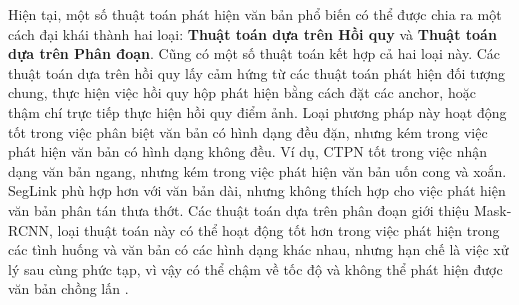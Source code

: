 Hiện tại, một số thuật toán phát hiện văn bản phổ biến có thể được chia ra một cách đại khái thành hai loại: \textbf{Thuật toán dựa trên Hồi quy} và \textbf{Thuật toán dựa trên Phân đoạn}. Cũng có một số thuật toán kết hợp cả hai loại này. Các thuật toán dựa trên hồi quy lấy cảm hứng từ các thuật toán phát hiện đối tượng chung, thực hiện việc hồi quy hộp phát hiện bằng cách đặt các anchor, hoặc thậm chí trực tiếp thực hiện hồi quy điểm ảnh. Loại phương pháp này hoạt động tốt trong việc phân biệt văn bản có hình dạng đều đặn, nhưng kém trong việc phát hiện văn bản có hình dạng không đều. Ví dụ, CTPN tốt trong việc nhận dạng văn bản ngang, nhưng kém trong việc phát hiện văn bản uốn cong và xoắn. SegLink phù hợp hơn với văn bản dài, nhưng không thích hợp cho việc phát hiện văn bản phân tán thưa thớt. Các thuật toán dựa trên phân đoạn giới thiệu Mask-RCNN, loại thuật toán này có thể hoạt động tốt hơn trong việc phát hiện trong các tình huống và văn bản có các hình dạng khác nhau, nhưng hạn chế là việc xử lý sau cùng phức tạp, vì vậy có thể chậm về tốc độ và không thể phát hiện được văn bản chồng lấn \cite{Dive-into-ocr-2022}.



